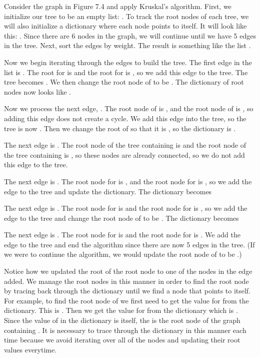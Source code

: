 Consider the graph in Figure 7.4 and apply Kruskal's algorithm.
First, we initialize our tree to be an empty list: \li{[]}.
To track the root nodes of each tree, we will also initialize a dictionary where each node points to itself.
It will look like this: .
Since there are 6 nodes in the graph, we will continue until we have 5 edges in the tree.
Next, sort the edges by weight.
The result is something like the list \li{[(C, D, 1), (C, E, 1), (D, E, 2), (A, B, 3), (B, F, 4), (E, F, 4), (B, C, 5), (C, F, 5), (A, F, 6)]}.

Now we begin iterating through the edges to build the tree.
The first edge in the list is .
The root for  is  and the root for  is , so we add this edge to the tree.
The tree becomes \li{[(C, D, 1)]}.
We then change the root node of  to be .
The dictionary of root nodes now looks like .

Now we process the next edge, .
The root node of  is , and the root node of  is , so adding this edge does not create a cycle.
We add this edge into the tree, so the tree is now \li{[(C, D, 1), (C, E, 1)]}.
Then we change the root of  so that it is , so the dictionary is .

The next edge is .
The root node of the tree containing  is  and the root node of the tree containing  is , so these nodes are already connected, so we do not add this edge to the tree.

The next edge is .
The root node for  is , and the root node for  is , so we add the edge to the tree and update the dictionary.
The dictionary becomes 

The next edge is .
The root node for  is  and the root node for  is , so we add the edge to the tree and change the root node of  to be .
The dictionary becomes 

The next edge is .
The root node for  is  and the root node for  is .
We add the edge to the tree and end the algorithm since there are now 5 edges in the tree.
(If we were to continue the algorithm, we would update the root node of  to be .)

Notice how we updated the root of the root node to one of the nodes in the edge added.
We manage the root nodes in this manner in order to find the root node by tracing back through the dictionary until we find a node that points to itself.
For example, to find the root node of  we first need to get the value for  from the dictionary.  This is .
Then we get the value for  from the dictionary which is .
Since the value of  in the dictionary is itself, the  is the root node of the graph containing .
It is necessary to trace through the dictionary in this manner each time because we avoid iterating over all of the nodes and updating their root values everytime.

